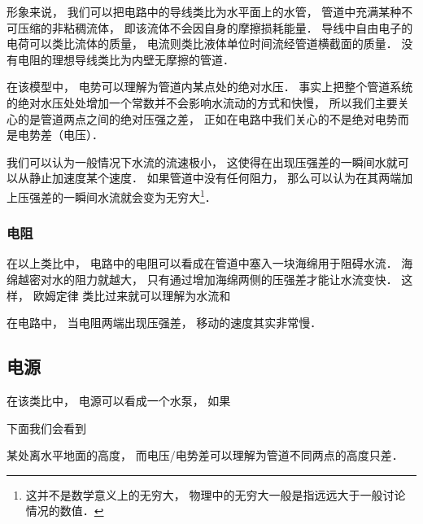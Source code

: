 


形象来说， 我们可以把电路中的导线类比为水平面上的水管， 管道中充满某种不可压缩的非粘稠流体， 即该流体不会因自身的摩擦损耗能量． 导线中自由电子的电荷可以类比流体的质量， 电流则类比液体单位时间流经管道横截面的质量． 没有电阻的理想导线类比为内壁无摩擦的管道．

在该模型中， 电势可以理解为管道内某点处的绝对水压． 事实上把整个管道系统的绝对水压处处增加一个常数并不会影响水流动的方式和快慢， 所以我们主要关心的是管道两点之间的绝对压强之差， 正如在电路中我们关心的不是绝对电势而是电势差（电压）．

我们可以认为一般情况下水流的流速极小， 这使得在出现压强差的一瞬间水就可以从静止加速度某个速度． 如果管道中没有任何阻力， 那么可以认为在其两端加上压强差的一瞬间水流就会变为无穷大\footnote{这并不是数学意义上的无穷大， 物理中的无穷大一般是指远远大于一般讨论情况的数值．}．

\subsubsection{电阻}
在以上类比中， 电路中的电阻可以看成在管道中塞入一块海绵用于阻碍水流． 海绵越密对水的阻力就越大， 只有通过增加海绵两侧的压强差才能让水流变快． 这样， 欧姆定律 类比过来就可以理解为水流和

在电路中， 当电阻两端出现压强差， 移动的速度其实非常慢． 

\subsection{电源}
在该类比中， 电源可以看成一个水泵， 如果




下面我们会看到

某处离水平地面的高度， 而电压/电势差可以理解为管道不同两点的高度只差．
